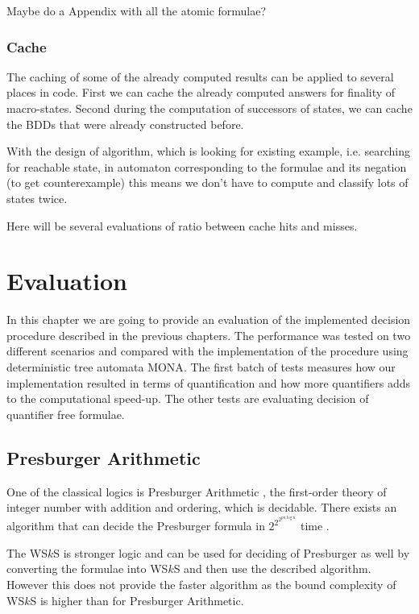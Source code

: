  {\color{red} Maybe do a Appendix with all the atomic formulae?}
 
 \subsection{Cache}
 
 The caching of some of the already computed results can be applied to several
 places in code. First we can cache the already computed answers for finality of
 macro-states. Second during the computation of successors of states, we can
 cache the BDDs that were already constructed before.
 
 With the design of algorithm, which is looking for existing example, i.e.
 searching for reachable state, in automaton corresponding to the formulae and
 its negation (to get counterexample) this means we don't have to compute
 and classify lots of states twice.
 
 {\color{red} Here will be several evaluations of ratio between cache hits and
 misses.}

\iffalse
\chapter{Evaluation}

In this chapter we are going to provide an evaluation of the implemented
decision procedure described in the previous chapters. The performance was
tested on two different scenarios and compared with the implementation of the
procedure using deterministic tree automata \textsc{MONA}. The first batch of
tests measures how our implementation resulted in terms of quantification and
how more quantifiers adds to the computational speed-up. The other tests are
evaluating decision of quantifier free formulae. 

\section{Presburger Arithmetic}

One of the classical logics is Presburger Arithmetic \cite{pres}, the
first-order theory of integer number with addition and ordering, which is
decidable. There exists an algorithm that can decide the Presburger formula in
$2^{2^{2^{pn\log n}}}$ time \cite{pres-time}. 

The WS$k$S is stronger logic and can be used for deciding of Presburger as well
by converting the formulae into WS$k$S and then use the described algorithm.
However this does not provide the faster algorithm as the bound complexity of
WS$k$S is higher than for Presburger Arithmetic. 

